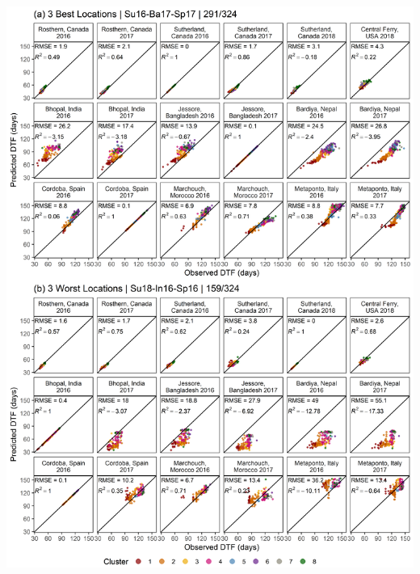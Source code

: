 \documentclass[
]{article}
\begin{document}
\includegraphics{Supplemental_Figure_07.png}
\end{document}
